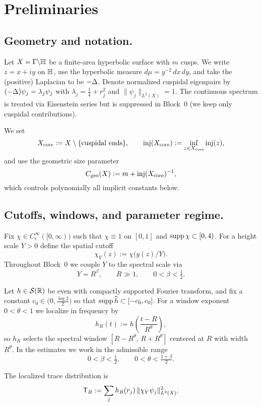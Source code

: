 \section{Preliminaries}\label{sec:prelim}

\subsection{Geometry and notation.}
Let $X=\Gamma\backslash\mathbb{H}$ be a finite-area hyperbolic surface with $m$ cusps.
We write $z=x+iy$ on $\mathbb{H}$, use the hyperbolic measure $d\mu=y^{-2}\,dx\,dy$, and take the (positive) Laplacian to be $-\Delta$.
Denote normalized cuspidal eigenpairs by $(-\Delta)\psi_j=\lambda_j\psi_j$ with $\lambda_j=\tfrac14+r_j^2$ and $\|\psi_j\|_{L^2(X)}=1$.
The continuous spectrum is treated via Eisenstein series but is suppressed in Block~0 (we keep only cuspidal contributions).

We set
\[
X_{\mathrm{core}}:=X\setminus\{\text{cuspidal ends}\},\qquad
\mathrm{inj}(X_{\mathrm{core}}):=\inf_{z\in X_{\mathrm{core}}}\mathrm{inj}(z),
\]
and use the geometric size parameter
\[
C_{\mathrm{geo}}(X):=m+\mathrm{inj}(X_{\mathrm{core}})^{-1},
\]
which controls polynomially all implicit constants below.

\subsection{Cutoffs, windows, and parameter regime.}
Fix $\chi\in C_c^\infty([0,\infty))$ such that $\chi\equiv 1$ on $[0,1]$ and $\operatorname{supp}\chi\subset[0,4)$.
For a height scale $Y>0$ define the spatial cutoff
\[
\chi_Y(z):=\chi\!\big(y(z)/Y\big).
\]
Throughout Block~0 we couple $Y$ to the spectral scale via
\[
Y=R^\beta,\qquad R\gg 1,\qquad 0<\beta<\tfrac12.
\]

Let $h\in\mathcal{S}(\mathbb{R})$ be even with compactly supported Fourier transform, and fix a constant
$c_0\in\big(0,\tfrac{\log 2}{2}\big)$ so that $\operatorname{supp} \widehat{h}\subset[-c_0,c_0]$.
For a window exponent $0<\theta<1$ we localize in frequency by
\[
h_R(t):=h\!\left(\frac{t-R}{R^\theta}\right),
\]
so $h_R$ selects the spectral window $[R-R^\theta,\,R+R^\theta]$ centered at $R$ with width $R^\theta$.
In the estimates we work in the admissible range
\[
0<\beta<\tfrac12,\qquad 0<\theta<\tfrac{1+\beta}{2}.
\]

\begin{definition}\label{def:TR}
The localized trace distribution is
\[
  \mathsf{T}_R := \sum_j h_R(r_j)\,\|\chi_Y\psi_j\|_{L^2(X)}^2.
\]
\end{definition}

